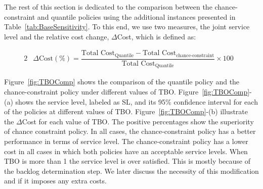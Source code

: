 \documentclass[11pt]{article}
\begin{document}
The rest of this section is dedicated to the comparison between the chance-constraint and quantile policies using the additional instances presented in Table~\ref{tab:BaseSensitivity}. To this end, we use two measures, the joint service level and the relative cost change, $\Delta$Cost, which is defined as: 

\begin{alignat}{2}
  & \Delta \text{Cost} (\%) = \dfrac{\text{Total Cost}_{\text{Quantile}} - \text{Total Cost} _{\text{chance-constraint}}}{\text{Total Cost}_\text{{Quantile}}} \times 100& \label{eq:ِDeltaCost} 
 \end{alignat}





Figure~\ref{fig:TBOComp} shows the comparison of the quantile policy and the chance-constraint policy under different values of TBO. Figure~\ref{fig:TBOComp}-(a) shows the service level, labeled as SL, and its 95\% confidence interval for each of the policies at different values of TBO. Figure~\ref{fig:TBOComp}-(b) illustrate the $\Delta$Cost for each value of TBO. The positive percentages show the superiority of chance constraint policy. In all cases, the chance-constraint policy has a better performance in terms of service level. The chance-constraint policy has a lower cost in all cases in which both policies have an acceptable service levels. When TBO is more than 1 the service level is over satisfied. This is mostly because of the backlog determination step. We later discuss the necessity of this modification and if it imposes any extra costs.  
\end{document}
